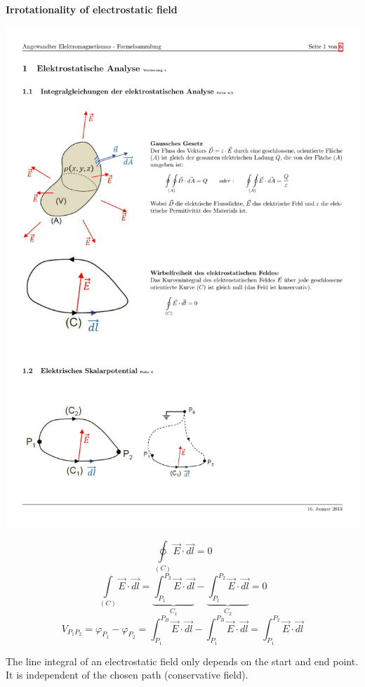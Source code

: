 \textbf{\\ \\ Irrotationality of electrostatic field \\}
\begin{minipage}[lt]{9cm}
	\includegraphics[width=.9\textwidth]{./images/WirbelfreiE2.pdf}
\end{minipage}
\begin{minipage}[rt]{10cm}
	\begin{equation*}
		\oint \limits_{\left(C\right)} \vec{E}\cdot \vec{dl} = 0
	\end{equation*}
	\begin{equation*}
		\int\limits_{\left(C\right)} \vec{E} \cdot \vec{dl} = \underbrace{\int_{P_1}^{P_2} \vec{E} \cdot \vec{dl}}_{C_1} - \underbrace{\int_{P_1}^{P_2} \vec{E} \cdot \vec{dl}}_{C_2} = 0
	\end{equation*}
	\begin{equation*}
		V_{P_1P_2} = \varphi_{P_1} - \varphi_{P_2} = \int_{P_1}^{P_B} \vec{E} \cdot \vec{dl} - \int_{P_1}^{P_B} \vec{E} \cdot \vec{dl} = \int_{P_1}^{P_2} \vec{E} \cdot \vec{dl}
	\end{equation*}
\end{minipage}
The line integral of an electrostatic field only depends on the start and end point. It is independent of the chosen path (conservative field).

